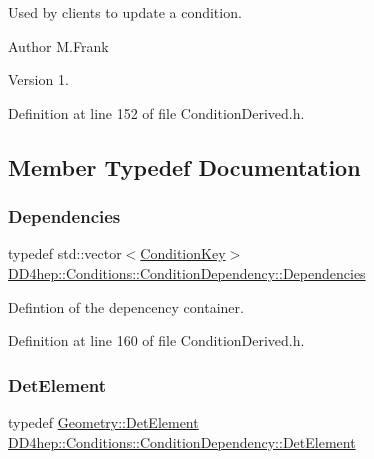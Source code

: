 Used by clients to update a condition.

\begin{DoxyAuthor}{Author}
M.\+Frank 
\end{DoxyAuthor}
\begin{DoxyVersion}{Version}
1. 
\end{DoxyVersion}


Definition at line 152 of file Condition\+Derived.\+h.



\subsection{Member Typedef Documentation}
\hypertarget{class_d_d4hep_1_1_conditions_1_1_condition_dependency_af1594501f40e514c5748092b94e4fd84}{}\label{class_d_d4hep_1_1_conditions_1_1_condition_dependency_af1594501f40e514c5748092b94e4fd84} 
\subsubsection{\texorpdfstring{Dependencies}{Dependencies}}
{\footnotesize\ttfamily typedef std\+::vector$<$\hyperlink{class_d_d4hep_1_1_conditions_1_1_condition_key}{Condition\+Key}$>$ \hyperlink{class_d_d4hep_1_1_conditions_1_1_condition_dependency_af1594501f40e514c5748092b94e4fd84}{D\+D4hep\+::\+Conditions\+::\+Condition\+Dependency\+::\+Dependencies}}



Defintion of the depencency container. 



Definition at line 160 of file Condition\+Derived.\+h.

\hypertarget{class_d_d4hep_1_1_conditions_1_1_condition_dependency_a0a9ea458cf85d1d76dec51d85830f738}{}\label{class_d_d4hep_1_1_conditions_1_1_condition_dependency_a0a9ea458cf85d1d76dec51d85830f738} 
\subsubsection{\texorpdfstring{Det\+Element}{DetElement}}
{\footnotesize\ttfamily typedef \hyperlink{class_d_d4hep_1_1_geometry_1_1_det_element}{Geometry\+::\+Det\+Element} \hyperlink{class_d_d4hep_1_1_conditions_1_1_condition_dependency_a0a9ea458cf85d1d76dec51d85830f738}{D\+D4hep\+::\+Conditions\+::\+Condition\+Dependency\+::\+Det\+Element}}



